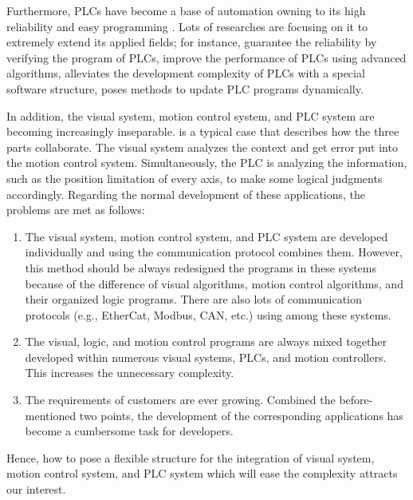 \documentclass[journal,UTF8]{IEEEtran}
\begin{document}
Furthermore, PLCs have become a base of automation owning to its high reliability and easy programming \cite{Hossain2014Advanced}. Lots of researches are focusing on it to extremely extend its applied fields; for instance, \cite{Jiang2013System} guarantee the reliability by verifying the program of PLCs, \cite{Dominic2016PLC} improve the performance of PLCs using advanced algorithms, \cite{wu2018customized} alleviates the development complexity of PLCs with a special software structure, \cite{Sch2013Development} poses methods to update PLC programs dynamically.


In addition, the visual system, motion control system, and PLC system are becoming increasingly inseparable. \cite{Chen2014A} is a typical case that describes how the three parts collaborate. The visual system analyzes the context and get error put into the motion control system. Simultaneously, the PLC is analyzing the information, such as the position limitation of every axis, to make some logical judgments accordingly. Regarding the normal development of these applications, the problems are met as follows:
 \begin{enumerate}
 	\item The visual system, motion control system, and PLC system are developed individually and using the communication protocol combines them. However, this method should be always redesigned the programs in these systems because of the difference of visual algorithms, motion control algorithms, and their organized logic programs. There are also lots of communication protocols (e.g., EtherCat, Modbus, CAN, etc.) using among these systems. 
 	\item The visual, logic, and motion control programs are always mixed together developed within numerous visual systems, PLCs, and motion controllers. This increases the unnecessary complexity. 
 	\item The requirements of customers are ever growing. Combined the before-mentioned two points, the development of the corresponding applications has become a cumbersome task for developers. 
 \end{enumerate}

Hence, how to pose a flexible structure for the integration of visual system, motion control system, and PLC system which will ease the complexity attracts our interest.
\end{document}
